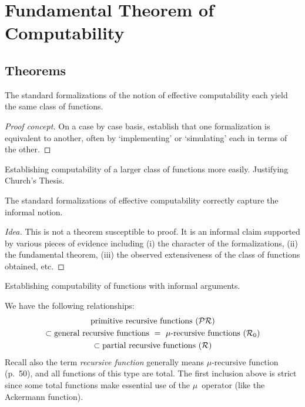%
%
%
\section{Fundamental Theorem of Computability}
\subsection*{Theorems}
\begin{thm}
The standard formalizations of the notion of effective computability each yield the same class of functions.
\end{thm}
\begin{proof}[Proof concept]
On a case by case basis, establish that one formalization is equivalent to another, often by `implementing' or `simulating' each in terms of the other.
\end{proof}
\begin{app}
Establishing computability of a larger class of functions more easily. Justifying Church's Thesis.
\end{app}

\begin{ths}[Church]
The standard formalizations of effective computability correctly capture the informal notion.
\end{ths}
\begin{proof}[Idea]
This is not a theorem susceptible to proof. It is an informal claim supported by various pieces of evidence including (i) the character of the formalizations, (ii) the fundamental theorem, (iii) the observed extensiveness of the class of functions obtained, etc.
\end{proof}
\begin{app}
Establishing computability of functions with informal arguments.
\end{app}

\begin{rmk}
We have the following relationships:
\begin{multline*}
\text{primitive recursive functions}\ (\mathcal{PR})\\
\subset\text{general recursive functions}\ =\ \mu\text{-recursive functions}\ (\mathcal{R}_0)\\
\subset\text{partial recursive functions}\ (\mathcal{R})
\end{multline*}
Recall also the term \emph{recursive function} generally means \(\mu\)-recursive function (p.~50), and all functions of this type are total. The first inclusion above is strict since some total functions make essential use of the \(\mu\)~operator (like the Ackermann function).
\end{rmk}


